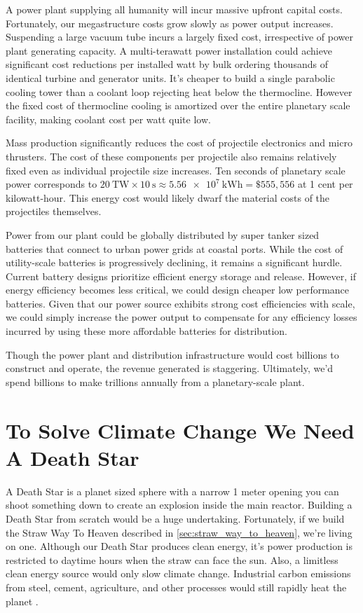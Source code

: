 \documentclass{article}
\begin{document}
A power plant supplying all humanity will incur massive upfront capital costs. Fortunately, our megastructure costs grow slowly as power output increases.   Suspending a large vacuum tube incurs a largely fixed cost, irrespective of power plant generating capacity. A multi-terawatt power installation could achieve significant cost reductions per installed watt by bulk ordering thousands of identical turbine and generator units. It's cheaper to build a single parabolic cooling tower than a coolant loop rejecting heat below the thermocline.   However the fixed cost of thermocline cooling is amortized over the entire planetary scale facility, making coolant cost per watt quite low.

Mass production significantly reduces the cost of projectile electronics and micro thrusters. The cost of these components per projectile also remains relatively fixed even as individual projectile size increases.  Ten seconds of planetary scale power corresponds to $\SI{20}{\tera\watt} \times \SI{10}{\second} \approx \SI{5.56e7}{\kilo\watt\hour} = \$555,556$ at 1 cent per kilowatt-hour.  This energy cost would likely dwarf the material costs of the projectiles themselves.      

Power from our plant could be globally distributed by super tanker sized batteries that connect to urban power grids at coastal ports.  While the cost of utility-scale batteries is progressively declining, it remains a significant hurdle. Current battery designs prioritize efficient energy storage and release. However, if energy efficiency becomes less critical, we could design cheaper low performance batteries. Given that our power source exhibits strong cost efficiencies with scale, we could simply increase the power output to compensate for any efficiency losses incurred by using these more affordable batteries for distribution.

Though the power plant and distribution infrastructure would cost billions to construct and operate, the revenue generated is staggering. Ultimately, we'd spend billions to make trillions annually from a planetary-scale plant.

\section{To Solve Climate Change We Need A Death Star}
A Death Star is a planet sized sphere with a  narrow 1 meter opening you can shoot something down to create an explosion inside the main reactor.   Building a Death Star from scratch  would be a huge undertaking.   Fortunately, if we build the Straw Way To Heaven described in \autoref{sec:straw_way_to_heaven}, we're living on one.  Although our Death Star produces clean energy, it's power production is restricted to daytime hours when the straw can face the sun.   Also, a limitless clean energy source would only slow climate change.   Industrial carbon emissions from steel, cement, agriculture, and other processes would still rapidly heat the planet \cite{steel_and_cement}.   
\end{document}
